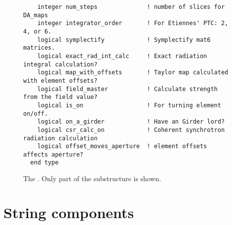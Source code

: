 \begin{figure}[htb]
\begin{verbatim}
    integer num_steps              ! number of slices for DA_maps
    integer integrator_order       ! For Etiennes' PTC: 2, 4, or 6.
    logical symplectify            ! Symplectify mat6 matrices.
    logical exact_rad_int_calc     ! Exact radiation integral calculation?
    logical map_with_offsets       ! Taylor map calculated with element offsets?
    logical field_master           ! Calculate strength from the field value?
    logical is_on                  ! For turning element on/off.
    logical on_a_girder            ! Have an Girder lord?
    logical csr_calc_on            ! Coherent synchrotron radiation calculation
    logical offset_moves_aperture  ! element offsets affects aperture?
  end type
\end{verbatim}
\caption[The .]{The . Only part of the 
  substructure is shown.}
\label{f:ele.struct}
\end{figure}

\section{String components}

